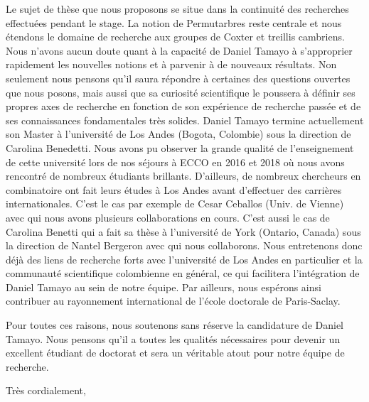 \documentclass[11pt,a4paper]{letter} %
\begin{document}
\begin{letter}
Le sujet de thèse que nous proposons se situe dans la continuité des recherches effectuées pendant le stage. La notion de Permutarbres reste centrale et nous étendons le domaine de recherche aux groupes de Coxter et treillis cambriens. Nous n'avons aucun doute quant à la capacité de Daniel Tamayo à s'approprier rapidement les nouvelles notions et à parvenir à de nouveaux résultats. Non seulement nous pensons qu'il saura répondre à certaines des questions ouvertes que nous posons, mais aussi que sa curiosité scientifique le poussera à définir ses propres axes de recherche en fonction de son expérience de recherche passée et de ses connaissances fondamentales très solides. Daniel Tamayo termine actuellement son Master à l'université de Los Andes (Bogota, Colombie) sous la direction de Carolina Benedetti. Nous avons pu observer la grande qualité de l'enseignement de cette université lors de nos séjours à ECCO en 2016 et 2018 où nous avons rencontré de nombreux étudiants brillants. D'ailleurs, de nombreux chercheurs en combinatoire ont fait leurs études à Los Andes avant d'effectuer des carrières internationales. C'est le cas par exemple de Cesar Ceballos (Univ. de Vienne) avec qui nous avons plusieurs collaborations en cours. C'est aussi le cas de Carolina Benetti qui a fait sa thèse à l'université de York (Ontario, Canada) sous la direction de Nantel Bergeron avec qui nous collaborons. Nous entretenons donc déjà des liens de recherche forts avec l'université de Los Andes en particulier et la communauté scientifique colombienne en général, ce qui facilitera l'intégration de Daniel Tamayo au sein de notre équipe. Par ailleurs, nous espérons ainsi contribuer au rayonnement international de l'école doctorale de Paris-Saclay. 

Pour toutes ces raisons, nous soutenons sans réserve la candidature de Daniel Tamayo. Nous pensons qu'il a toutes les qualités nécessaires pour devenir un excellent étudiant de doctorat et sera un véritable atout pour notre équipe de recherche.

 

\closing{Très cordialement,}


\end{letter}
\end{document}
